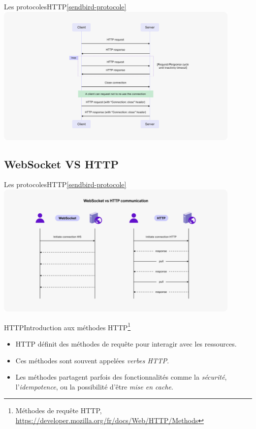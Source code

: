 \documentclass{beamer}
\begin{document}
    \begin{frame}{Les protocoles}{HTTP\cref{sendbird-protocole}}
        \centering
        \includegraphics[width=12cm]{image/Tutorial-HTTP-connection-chart}
    \end{frame}

    \subsection{WebSocket VS HTTP}\label{subsec:ws-vs-http}

    \begin{frame}{Les protocoles}{HTTP\cref{sendbird-protocole}}
        \centering
        \includegraphics[width=12cm]{image/Tutorial-WebSocket-vs.-HTTP-communication-diagram}
    \end{frame}

    \begin{frame}{HTTP}{Introduction aux méthodes HTTP\footnote{\label{mozilla-http-methods}Méthodes de requête HTTP, \url{https://developer.mozilla.org/fr/docs/Web/HTTP/Methods}}}
        \begin{itemize}
            \item HTTP définit des méthodes de requête pour interagir avec les ressources.
            \item Ces méthodes sont souvent appelées \textit{verbes HTTP}.
            \item Les méthodes partagent parfois des fonctionnalités comme la \textit{sécurité}, l'\textit{idempotence}, ou la possibilité d'être \textit{mise en cache}.
        \end{itemize}
    \end{frame}
\end{document}
